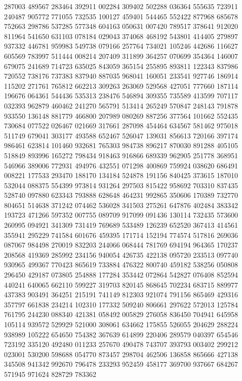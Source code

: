 {287003 489567 283464 392911 002284 309402 502288 036364 555635 723911 240487%
905772 771055 732535 100127 459401 544465 552422 877968 685678 752663 298786%
537285 577348 604163 050631 007420 789517 378641 912020 811964 541650 631103%
078184 029043 374068 468192 543801 414405 279897 937332 446781 959983 549738%
079166 257764 734021 105246 442686 116627 605569 783997 511444 008214 207409%
311899 364257 070699 354364 146007 679075 241689 714723 635025 843059 365154%
255895 893811 122343 837986 720552 738176 737383 837940 887035 968041 160051%
233541 927746 186914 115202 271761 765812 662213 309263 263069 529568 427051%
777660 187114 196676 064361 544436 535313 238476 546894 309355 735589 413599%
707117 032393 962879 460462 241270 565791 513414 265249 570847 248143 791878%
933550 136148 881779 466800 207989 080269 887256 377564 101662 552435 730684%
077522 026467 021669 317661 287098 454464 634567 581462 975018 511749 679041%
303177 493588 652467 526047 139031 856613 720166 397174 986461 623814 101460%
932681 765303 984738 896217 870030 891288 405105 518849 893996 165272 798434%
918463 916866 689339 962905 251778 368951 546966 389006 772931 494976 432551%
071298 400869 759924 038620 686491 008221 177533 293470 188170 134184 524878%
191156 840425 373615 187010 532044 088375 554399 973814 931264 297503 815422%
958692 703310 837435 528740 097880 623343 793888 628648 464231 992865 350606%
170389 732770 804651 514638 371242 074462 536028 341503 275261 647876 402484%
383342 193723 471266 597352 007755 089709 917099 091436 130114 732435 573600%
260995 094921 341309 731419 769689 533489 126239 652520 367413 414561 355941%
295229 741584 601676 459395 171714 152194 774574 517816 269036 087067 984498%
270019 832203 244066 068444 781769 694194 964365 170237 208568 419369 285992%
234156 940054 426735 422138 095720 233513 097740 930965 499367 770423 865619%
733884 476322 800740 459182 538256 050808 296450 429187 073805 254888 177284%
353442 072864 542827 076408 852594 440241 640065 662110 599227 319703 820145%
868645 702234 683715 889977 437383 903491 364251 215191 741149 812303 921074%
791156 865469 429316 357797 661838 234214 102310 177332 509240 806661 297622%
572013 125784 761795 244230 088340 421381 058492 005829 276058 836450 704941%
645958 105114 939572 529929 521000 308061 634662 175855 526055 204629 288224%
938989 105222 654650 754382 367639 614899 220406 289579 040397 654546 723192%
335120 492480 011233 257670 490478 743707 393793 003402 299212 023001 530200%
598688 054770 873457 298704 462506 136858 865666 427138 345508 941342 992670%
796478 233293 952459 458177 369700 937667 684267 571945 971624 828729 783362%
}
